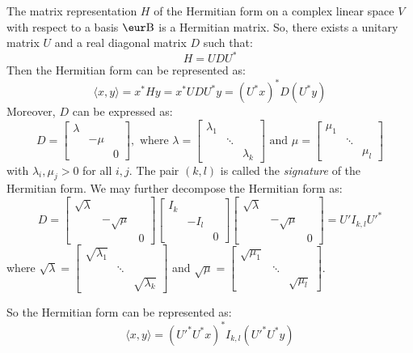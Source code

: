 \begin{proposition}
	The matrix representation $H$ of the Hermitian form on a complex linear space $V$ with respect to a basis $\B$ is a Hermitian matrix. So, there exists a unitary matrix $U$ and a real diagonal matrix $D$ such that:
	\[
		H = U D U^*
	\]
	Then the Hermitian form can be represented as:
	\[
		\langle x, y \rangle = x^* H y = x^* U D U^* y = {(U^* x)}^* D (U^* y)
	\]
	Moreover, $D$ can be expressed as:
	\[
		D = \begin{bmatrix} \lambda \\ & -\mu \\ & & 0 \end{bmatrix}, \text{ where } \lambda = \begin{bmatrix} \lambda_1 & & \\ & \ddots & \\ & & \lambda_k \end{bmatrix} \text{ and } \mu = \begin{bmatrix} \mu_1 & & \\ & \ddots & \\ & & \mu_l \end{bmatrix}
	\]
	with $\lambda_i, \mu_j > 0$ for all $i, j$. The pair $(k, l)$ is called the \emph{signature} of the Hermitian form. We may further decompose the Hermitian form as:
	\[
		D = \begin{bmatrix} \sqrt{\lambda} \\ & -\sqrt{\mu} \\ & & 0 \end{bmatrix} \begin{bmatrix} I_k \\ & -I_l \\ & & 0 \end{bmatrix} \begin{bmatrix} \sqrt{\lambda} \\ & -\sqrt{\mu} \\ & & 0 \end{bmatrix} = U' I_{k, l} U'^*
	\]
	where $\sqrt{\lambda} = \begin{bmatrix} \sqrt{\lambda_1} & & \\ & \ddots & \\ & & \sqrt{\lambda_k} \end{bmatrix}$ and $\sqrt{\mu} = \begin{bmatrix} \sqrt{\mu_1} & & \\ & \ddots & \\ & & \sqrt{\mu_l} \end{bmatrix}$.

	So the Hermitian form can be represented as:
	\[
		\langle x, y \rangle = {(U'^* U^* x)}^* I_{k, l} (U'^* U^* y)
	\]
\end{proposition}

